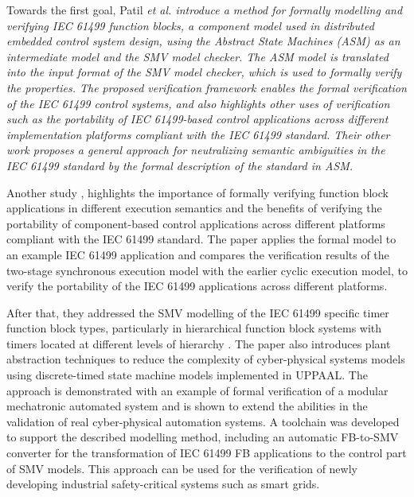 \documentclass[runningheads]{llncs}
\newcommand{\etal}{\it et al. \normalfont}
\begin{document}
 
 Towards the first goal, Patil \etal \cite{patil2015formal} introduce a method for formally modelling and verifying IEC 61499 function blocks, a component model used in distributed embedded control system design, using the Abstract State Machines (ASM) as an intermediate model and the SMV model checker. The ASM model is translated into the input format of the SMV model checker, which is used to formally verify the properties. The proposed verification framework enables the formal verification of the IEC 61499 control systems, and also highlights other uses of verification such as the portability of IEC 61499-based control applications across different implementation platforms compliant with the IEC 61499 standard. Their other work \cite{patil2015neutralizing} proposes a general approach for neutralizing semantic ambiguities in the IEC 61499 standard by the formal description of the standard in ASM.



Another study \cite{patil2015formal}, highlights the importance of formally verifying function block applications in different execution semantics and the benefits of verifying the portability of component-based control applications across different platforms compliant with the IEC 61499 standard. The paper applies the formal model to an example IEC 61499 application and compares the verification results of the two-stage synchronous execution model with the earlier cyclic execution model, to verify the portability of the IEC 61499 applications across different platforms.

After that, they addressed the SMV modelling of the IEC 61499 specific timer function block types, particularly in hierarchical function block systems with timers located at different levels of hierarchy \cite{drozdov2016formal}. The paper also introduces plant abstraction techniques to reduce the complexity of cyber-physical systems models using discrete-timed state machine models implemented in UPPAAL. The approach is demonstrated with an example of formal verification of a modular mechatronic automated system and is shown to extend the abilities in the validation of real cyber-physical automation systems. A toolchain was developed to support the described modelling method, including an automatic FB-to-SMV converter for the transformation of IEC 61499 FB applications to the control part of SMV models. This approach can be used for the verification of newly developing industrial safety-critical systems such as smart grids.
\end{document}

